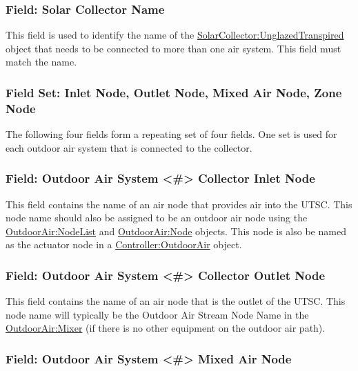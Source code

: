 \subsubsection{Field: Solar Collector Name}\label{field-solar-collector-name}

This field is used to identify the name of the \hyperref[solarcollectorunglazedtranspired]{SolarCollector:UnglazedTranspired} object that needs to be connected to more than one air system. This field must match the name.

\subsubsection{Field Set: Inlet Node, Outlet Node, Mixed Air Node, Zone Node}\label{field-set-inlet-node-outlet-node-mixed-air-node-zone-node}

The following four fields form a repeating set of four fields. One set is used for each outdoor air system that is connected to the collector.

\subsubsection{Field: Outdoor Air System \textless{}\#\textgreater{} Collector Inlet Node}\label{field-outdoor-air-system-collector-inlet-node}

This field contains the name of an air node that provides air into the UTSC. This node name should also be assigned to be an outdoor air node using the \hyperref[outdoorairnodelist]{\hyperref[outdoorairnode]{OutdoorAir:Node}List} and \hyperref[outdoorairnode]{OutdoorAir:Node} objects. This node is also be named as the actuator node in a \hyperref[controlleroutdoorair]{Controller:OutdoorAir} object.

\subsubsection{Field: Outdoor Air System \textless{}\#\textgreater{} Collector Outlet Node}\label{field-outdoor-air-system-collector-outlet-node}

This field contains the name of an air node that is the outlet of the UTSC. This node name will typically be the Outdoor Air Stream Node Name in the \hyperref[outdoorairmixer]{OutdoorAir:Mixer} (if there is no other equipment on the outdoor air path).

\subsubsection{Field: Outdoor Air System \textless{}\#\textgreater{} Mixed Air Node}\label{field-outdoor-air-system-mixed-air-node}

